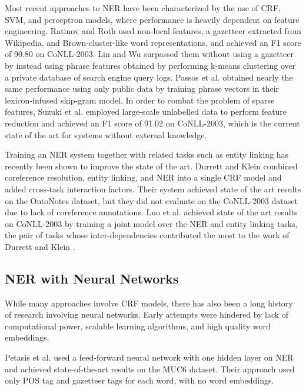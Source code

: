 \documentclass[11pt,letterpaper]{article}
\begin{document}
Most recent approaches to NER have been characterized by the use of CRF, SVM, and perceptron models, where performance is heavily dependent on feature engineering. Ratinov and Roth  used non-local features, a gazetteer extracted from Wikipedia, and Brown-cluster-like word representations, and achieved an F1 score of 90.80 on CoNLL-2003. Lin and Wu  surpassed them without using a gazetteer by instead using phrase features obtained by performing k-means clustering over a private database of search engine query logs. Passos et al.  obtained nearly the same performance using only public data by training phrase vectors in their lexicon-infused skip-gram model. In order to combat the problem of sparse features, Suzuki et al.  employed large-scale unlabelled data to perform feature reduction and achieved an F1 score of 91.02 on CoNLL-2003, which is the current state of the art for systems without external knowledge.

Training an NER system together with related tasks such as entity linking has recently been shown to improve the state of the art. Durrett and Klein  combined coreference resolution, entity linking, and NER into a single CRF model and added cross-task interaction factors. Their system achieved state of the art results on the OntoNotes dataset, but they did not evaluate on the CoNLL-2003 dataset due to lack of coreference annotations. Luo et al.  achieved state of the art results on CoNLL-2003 by training a joint model over the NER and entity linking tasks, the pair of tasks whose inter-dependencies contributed the most to the work of Durrett and Klein .




\subsection{NER with Neural Networks}

While many approaches involve CRF models, there has also been a long history of research involving neural networks. Early attempts were hindered by lack of computational power, scalable learning algorithms, and high quality word embeddings. 

Petasis et al.  used a feed-forward neural network with one hidden layer on NER and achieved state-of-the-art results on the MUC6 dataset. Their approach used only POS tag and gazetteer tags for each word, with no word embeddings. 
\end{document}
